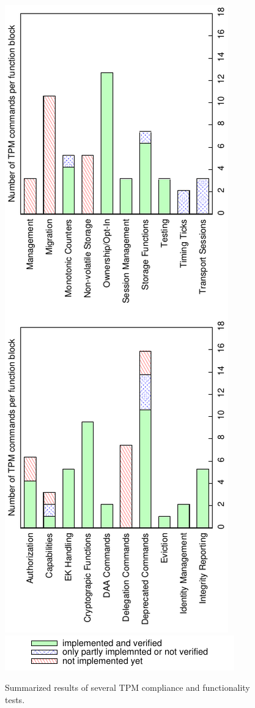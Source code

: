 \documentclass[runningheads]{llncs}
\begin{document}
\begin{figure}
	\vspace*{-3mm}\centering
	\includegraphics[angle=-90,scale=0.6]{plots/compliance}
	\includegraphics[origin=br,angle=90,scale=0.6]{plots/compliance_key}
	\caption{Summarized results of several TPM compliance and functionality
			tests.}
	\label{plot:compliance}\vspace*{-5mm}
\end{figure}
\end{document}
